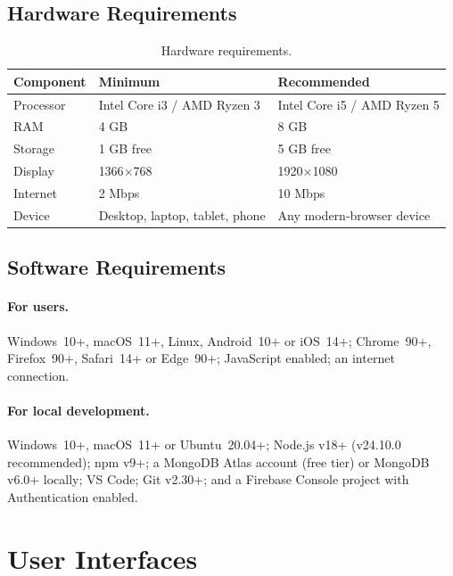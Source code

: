 \documentclass[12pt,a4paper]{report}
\begin{document}
\subsection{Hardware Requirements}
\begin{table}[H]
\centering
\caption{Hardware requirements.}
\label{tab:hw}
\small
\begin{tabularx}{\textwidth}{l X X}
\toprule
\textbf{Component} & \textbf{Minimum} & \textbf{Recommended} \\
\midrule
Processor & Intel Core i3 / AMD Ryzen 3 & Intel Core i5 / AMD Ryzen 5 \\
RAM       & 4 GB                        & 8 GB \\
Storage   & 1 GB free                   & 5 GB free \\
Display   & 1366$\times$768             & 1920$\times$1080 \\
Internet  & 2 Mbps                      & 10 Mbps \\
Device    & Desktop, laptop, tablet, phone & Any modern-browser device \\
\bottomrule
\end{tabularx}
\end{table}

\subsection{Software Requirements}
\paragraph{For users.} Windows~10+, macOS~11+, Linux, Android~10+ or iOS~14+;
Chrome~90+, Firefox~90+, Safari~14+ or Edge~90+; JavaScript enabled; an
internet connection.
\paragraph{For local development.} Windows~10+, macOS~11+ or Ubuntu~20.04+;
Node.js v18+ (v24.10.0 recommended); npm v9+; a MongoDB Atlas account (free
tier) or MongoDB v6.0+ locally; VS Code; Git v2.30+; and a Firebase Console
project with Authentication enabled.

\section{User Interfaces}
\end{document}

